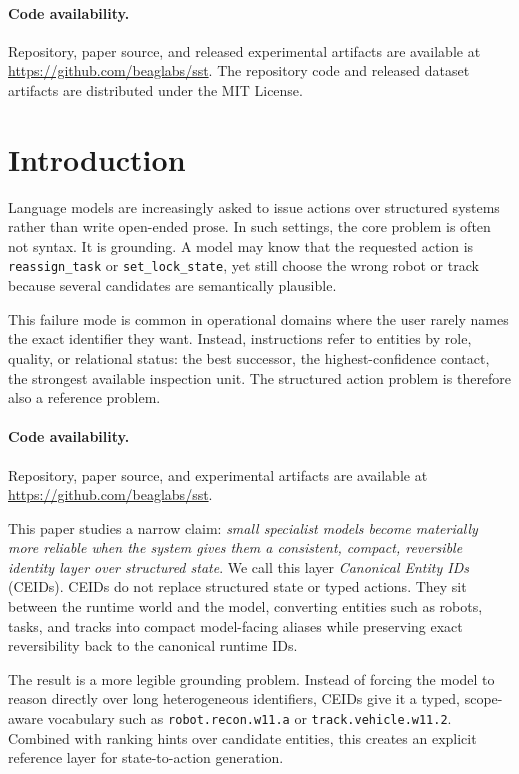 \documentclass[manuscript,screen,review]{jair}
\begin{document}
\maketitle

\paragraph{Code availability.}
Repository, paper source, and released experimental artifacts are available at \url{https://github.com/beaglabs/sst}. The repository code and released dataset artifacts are distributed under the MIT License.

\section{Introduction}
Language models are increasingly asked to issue actions over structured systems rather than write open-ended prose. In such settings, the core problem is often not syntax. It is grounding. A model may know that the requested action is \texttt{reassign\_task} or \texttt{set\_lock\_state}, yet still choose the wrong robot or track because several candidates are semantically plausible.

This failure mode is common in operational domains where the user rarely names the exact identifier they want. Instead, instructions refer to entities by role, quality, or relational status: the best successor, the highest-confidence contact, the strongest available inspection unit. The structured action problem is therefore also a reference problem.

\paragraph{Code availability.}
Repository, paper source, and experimental artifacts are available at \url{https://github.com/beaglabs/sst}.

This paper studies a narrow claim: \emph{small specialist models become materially more reliable when the system gives them a consistent, compact, reversible identity layer over structured state}. We call this layer \emph{Canonical Entity IDs} (CEIDs). CEIDs do not replace structured state or typed actions. They sit between the runtime world and the model, converting entities such as robots, tasks, and tracks into compact model-facing aliases while preserving exact reversibility back to the canonical runtime IDs.

The result is a more legible grounding problem. Instead of forcing the model to reason directly over long heterogeneous identifiers, CEIDs give it a typed, scope-aware vocabulary such as \texttt{robot.recon.w11.a} or \texttt{track.vehicle.w11.2}. Combined with ranking hints over candidate entities, this creates an explicit reference layer for state-to-action generation.
\end{document}
